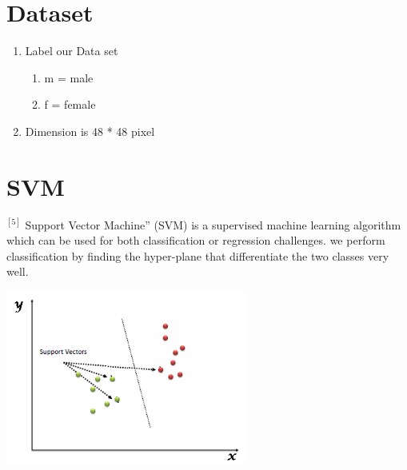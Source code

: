 \documentclass[journal]{IEEEtran}
\begin{document}
	
	\section{Dataset}
	\begin{enumerate}
		\item Label our Data set
		\begin{enumerate}
			\item m = male
			\item f = female
		\end{enumerate}
		
		\item Dimension is 48 * 48 pixel
		
		
	\end{enumerate}
	\section{SVM}$^{[5]}$
	Support Vector Machine” (SVM) is a supervised machine learning algorithm which can be used for both classification or regression challenges.
	we perform classification by finding the hyper-plane that differentiate the two classes very well.
	\begin{minipage}{\linewidth}
		\centering
		\includegraphics[width = 80mm]{svm1.png}
		\end{minipage} 
\end{document}
